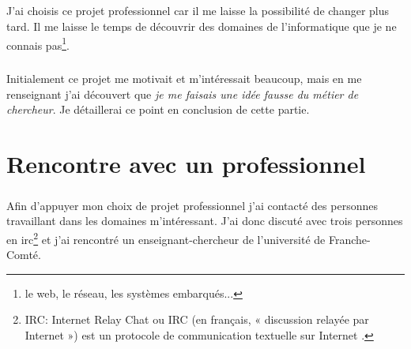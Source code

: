 \documentclass[a4paper,12pt, draft]{report}
\begin{document}
\paragraph{}
J'ai choisis ce projet professionnel car il me laisse la possibilité de changer plus tard. Il me laisse le temps de découvrir des domaines de l'informatique que je ne connais pas\footnote{le web, le réseau, les systèmes embarqués...}. 

\paragraph{}
Initialement ce projet me motivait et m'intéressait beaucoup, mais en me renseignant j'ai découvert que \textit{je me faisais une idée fausse du métier de chercheur}. Je détaillerai ce point en conclusion de cette partie.


%
%
%

\chapter{Rencontre avec un professionnel}
\paragraph{}
Afin d'appuyer mon choix de projet professionnel j'ai contacté des personnes travaillant dans les domaines m'intéressant.
J'ai donc discuté avec trois personnes en irc\footnote{\textsc{IRC}: Internet Relay Chat ou IRC (en français, « discussion relayée par Internet ») est un protocole de communication textuelle sur Internet .} et j'ai rencontré un enseignant-chercheur de l'université de Franche-Comté.
\end{document}
